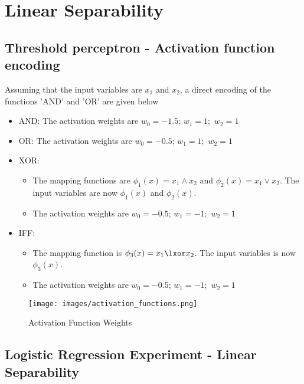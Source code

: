 \documentclass[a4paper]{article}
\begin{document}
\section{Linear Separability}

\subsection{Threshold perceptron - Activation function encoding}
Assuming that the input variables are $x_1$ and $x_2$, a direct encoding of the functions 'AND' and 'OR' are given below
\begin{itemize}
	\item AND: The activation weights are $w_0 = -1.5$; $w_1 = 1;$ $w_2 = 1$
	\item OR: The activation weights are $w_0 = -0.5$; $w_1 = 1;$ $w_2 = 1$
	\item XOR: 
		\begin{itemize}
			\item The mapping functions are $\phi_1(x) = x_1 \land x_2$ and $\phi_2(x) = x_1 \lor x_2$. The input variables are now $\phi_1(x)$ and $\phi_2(x)$.
			\item The activation weights are $w_0 = -0.5$; $w_1 = -1;$ $w_2 = 1$
		\end{itemize}
	\item IFF: 
		\begin{itemize}
			\item The mapping function is $\phi_3(x) = x_1 \lxor x_2$. The input variables is now $\phi_3(x)$.
			\item The activation weights are $w_0 = -0.5$; $w_1 = -1;$ $w_2 = 1$
		\end{itemize}
\end{itemize}


\begin{figure*}[h]
    \centering
    \texttt{[image: images/activation\_functions.png]}
    \caption{Activation Function Weights}
    \label{fig_activation_function_weights}
\end{figure*}

\newpage

\subsection{Logistic Regression Experiment - Linear Separability}
\end{document}
